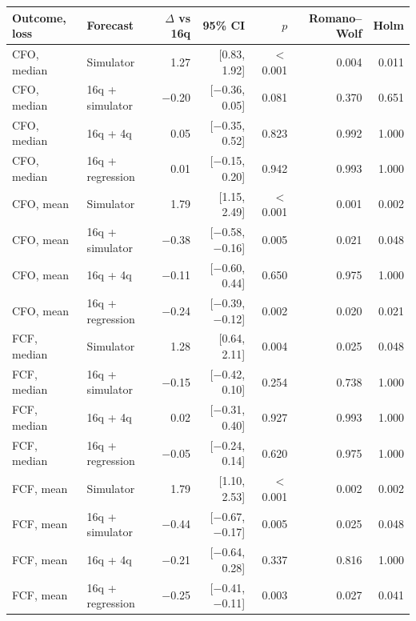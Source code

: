 \begin{tabular}{llrrrrr}
\toprule
Outcome, loss & Forecast & $\Delta$ vs 16q & 95\% CI & $p$ & Romano--Wolf & Holm \\
\midrule
CFO, median & Simulator & 1.27 & [0.83, 1.92] & $<$0.001 & 0.004 & 0.011 \\
CFO, median & 16q + simulator & $-$0.20 & [$-$0.36, 0.05] & 0.081 & 0.370 & 0.651 \\
CFO, median & 16q + 4q & 0.05 & [$-$0.35, 0.52] & 0.823 & 0.992 & 1.000 \\
CFO, median & 16q + regression & 0.01 & [$-$0.15, 0.20] & 0.942 & 0.993 & 1.000 \\
CFO, mean & Simulator & 1.79 & [1.15, 2.49] & $<$0.001 & 0.001 & 0.002 \\
CFO, mean & 16q + simulator & $-$0.38 & [$-$0.58, $-$0.16] & 0.005 & 0.021 & 0.048 \\
CFO, mean & 16q + 4q & $-$0.11 & [$-$0.60, 0.44] & 0.650 & 0.975 & 1.000 \\
CFO, mean & 16q + regression & $-$0.24 & [$-$0.39, $-$0.12] & 0.002 & 0.020 & 0.021 \\
FCF, median & Simulator & 1.28 & [0.64, 2.11] & 0.004 & 0.025 & 0.048 \\
FCF, median & 16q + simulator & $-$0.15 & [$-$0.42, 0.10] & 0.254 & 0.738 & 1.000 \\
FCF, median & 16q + 4q & 0.02 & [$-$0.31, 0.40] & 0.927 & 0.993 & 1.000 \\
FCF, median & 16q + regression & $-$0.05 & [$-$0.24, 0.14] & 0.620 & 0.975 & 1.000 \\
FCF, mean & Simulator & 1.79 & [1.10, 2.53] & $<$0.001 & 0.002 & 0.002 \\
FCF, mean & 16q + simulator & $-$0.44 & [$-$0.67, $-$0.17] & 0.005 & 0.025 & 0.048 \\
FCF, mean & 16q + 4q & $-$0.21 & [$-$0.64, 0.28] & 0.337 & 0.816 & 1.000 \\
FCF, mean & 16q + regression & $-$0.25 & [$-$0.41, $-$0.11] & 0.003 & 0.027 & 0.041 \\
\bottomrule
\end{tabular}
